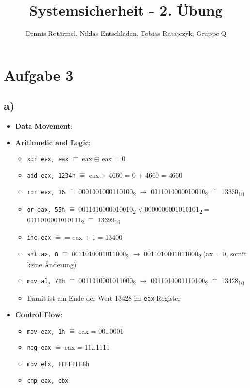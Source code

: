 \documentclass[]{article}
\title{Systemsicherheit - 2. Übung}
\author{Dennis Rotärmel, Niklas Entschladen, Tobias Ratajczyk, Gruppe Q}
\begin{document}
\maketitle
\section{Aufgabe 3}
\subsection*{a)}
\begin{itemize}
	\item \textbf{Data Movement}:
	
	\item  \textbf{Arithmetic and Logic}:
	\begin{itemize}
		\item \texttt{xor eax, eax} $\hat{=}$ eax $\oplus$ eax = 0
		\item \texttt{add eax, 1234h} $\hat{=}$ eax + 4660 = 0 + 4660 = 4660
		\item \texttt{ror eax, 16} $\hat{=}$ {0001001000110100}\textsubscript{2} $\rightarrow$ {0011010000010010}\textsubscript{2} $\hat{=}$  {13330}\textsubscript{10}
		\item \texttt{or eax, 55h} $\hat{=}$ {0011010000010010}\textsubscript{2} $\vee$ {0000000001010101}\textsubscript{2} = {0011010001010111}\textsubscript{2} $\hat{=}$ {13399}\textsubscript{10}
		\item \texttt{inc eax} $\hat{=}$ = eax + 1 = 13400
		\item \texttt{shl ax, 8} $\hat{=}$ 0011010001011000\textsubscript{2} $\rightarrow$ 0011010001011000\textsubscript{2} (ax = 0, somit keine Änderung)
		\item  \texttt{mov al, 78h} $\hat{=}$ 0011010001011000\textsubscript{2} $\rightarrow$ 0011010001110100\textsubscript{2} $\hat{=}$ 13428\textsubscript{10}
		\item Damit ist am Ende der Wert 13428 im \texttt{eax} Register
	\end{itemize}
	
	\item \textbf{Control Flow}:
	\begin{itemize}
		\item \texttt{mov eax, 1h} $\hat{=}$ eax = 00\dots0001
		\item \texttt{neg eax} $\hat{=}$ eax = 11\dots1111
		\item \texttt{mov ebx, FFFFFFF8h}
		\item \texttt{cmp eax, ebx} 
	\end{itemize}
\end{itemize}
\end{document}
